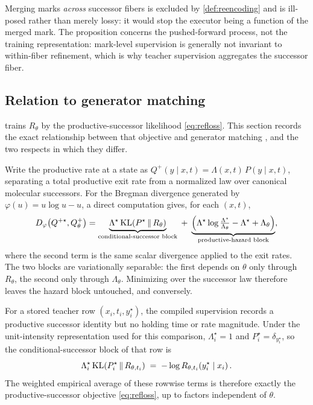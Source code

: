 Merging marks \emph{across} successor fibers is excluded by \cref{def:reencoding} and is ill-posed rather than merely lossy: it would stop the executor being a function of the merged mark. The proposition concerns the pushed-forward process, not the training representation: mark-level supervision is generally not invariant to within-fiber refinement, which is why teacher supervision aggregates the successor fiber.

\subsection{Relation to generator matching}
\label{app:gm}

 trains $R_\theta$ by the productive-successor likelihood \eqref{eq:refloss}. This section records the exact relationship between that objective and generator matching \citep{holderrieth2025generator}, and the two respects in which they differ.

Write the productive rate at a state as $Q^{+}(y\mid x,t)=\Lambda(x,t)\,P(y\mid x,t)$, separating a total productive exit rate from a normalized law over canonical molecular successors. For the Bregman divergence generated by $\varphi(u)=u\log u-u$, a direct computation gives, for each $(x,t)$,
\begin{equation}
D_\varphi\!\left(Q^{+\star},Q^{+}_\theta\right)
=\underbrace{\Lambda^{\star}\,\mathrm{KL}\!\left(P^{\star}\,\middle\|\,R_\theta\right)}_{\text{conditional-successor block}}
\;+\;\underbrace{\Bigl(\Lambda^{\star}\log\tfrac{\Lambda^{\star}}{\Lambda_\theta}-\Lambda^{\star}+\Lambda_\theta\Bigr)}_{\text{productive-hazard block}},
\label{eq:gmsplit}
\end{equation}
where the second term is the same scalar divergence applied to the exit rates. The two blocks are variationally separable: the first depends on $\theta$ only through $R_\theta$, the second only through $\Lambda_\theta$. Minimizing over the successor law therefore leaves the hazard block untouched, and conversely.

For a stored \method{} teacher row $(x_i,t_i,y_i^{\star})$, the compiled supervision records a productive successor identity but no holding time or rate magnitude. Under the unit-intensity representation used for this comparison, $\Lambda^{\star}_i=1$ and $P^{\star}_i=\delta_{y^{\star}_i}$, so the conditional-successor block of that row is
\[
\Lambda^{\star}_i\,\mathrm{KL}\!\left(P^{\star}_i\,\middle\|\,R_{\theta,t_i}\right)
\;=\;-\log R_{\theta,t_i}\!\left(y^{\star}_i\mid x_i\right).
\]
The weighted empirical average of these rowwise terms is therefore exactly the productive-successor objective \eqref{eq:refloss}, up to factors independent of $\theta$.

